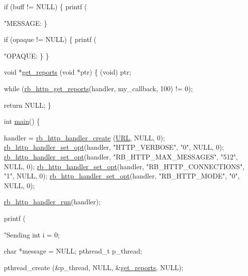 \begin{DoxyCode}
{{    \textcolor{keywordflow}{if} (buff != NULL) \{
        printf (\textcolor{stringliteral}{"MESSAGE: %
    \}

    \textcolor{keywordflow}{if} (opaque != NULL) \{
        printf (\textcolor{stringliteral}{"OPAQUE: %
    \}
\}

\textcolor{keywordtype}{void} *\hyperlink{rb__http__handler__example_8c_a57c5c030092520363d405723c56b28c2}{get\_reports} (\textcolor{keywordtype}{void} *ptr) \{
    (void) ptr;

    \textcolor{keywordflow}{while} (\hyperlink{rb__http__handler_8c_a890e981b619b1bdd5cc37fa16bb06f06}{rb\_http\_get\_reports}(handler, my\_callback, 100) != 0);

    \textcolor{keywordflow}{return} NULL;
\}

\textcolor{keywordtype}{int} \hyperlink{rb__http__handler__example_8c_ae66f6b31b5ad750f1fe042a706a4e3d4}{main}() \{

    handler = \hyperlink{rb__http__handler_8c_aa338cb73c0754c16c8a05621b995ea59}{rb\_http\_handler\_create} (\hyperlink{rb__http__handler__example_8c_a41d49c9bf1512077295129c1406be4cd}{URL}, NULL, 0);
    \hyperlink{rb__http__handler_8c_ab306abb2b4a66b092205de2677d342aa}{rb\_http\_handler\_set\_opt}(handler, \textcolor{stringliteral}{"HTTP\_VERBOSE"}, \textcolor{stringliteral}{"0"}, NULL, 0);
    \hyperlink{rb__http__handler_8c_ab306abb2b4a66b092205de2677d342aa}{rb\_http\_handler\_set\_opt}(handler, \textcolor{stringliteral}{"RB\_HTTP\_MAX\_MESSAGES"}, \textcolor{stringliteral}{"512"}, NULL, 0);
    \hyperlink{rb__http__handler_8c_ab306abb2b4a66b092205de2677d342aa}{rb\_http\_handler\_set\_opt}(handler, \textcolor{stringliteral}{"RB\_HTTP\_CONNECTIONS"}, \textcolor{stringliteral}{"1"}, NULL, 0);
    \hyperlink{rb__http__handler_8c_ab306abb2b4a66b092205de2677d342aa}{rb\_http\_handler\_set\_opt}(handler, \textcolor{stringliteral}{"RB\_HTTP\_MODE"}, \textcolor{stringliteral}{"0"}, NULL, 0);

    \hyperlink{rb__http__handler_8c_aec9a18015fc9221b582348ccfb48cb34}{rb\_http\_handler\_run}(handler);

    printf (\textcolor{stringliteral}{"Sending %
    \textcolor{keywordtype}{int} i = 0;

    \textcolor{keywordtype}{char} *message = NULL;
    pthread\_t p\_thread;

    pthread\_create (&p\_thread, NULL, &\hyperlink{rb__http__handler__example_8c_a57c5c030092520363d405723c56b28c2}{get\_reports}, NULL);

}}}}}
\end{DoxyCode}
